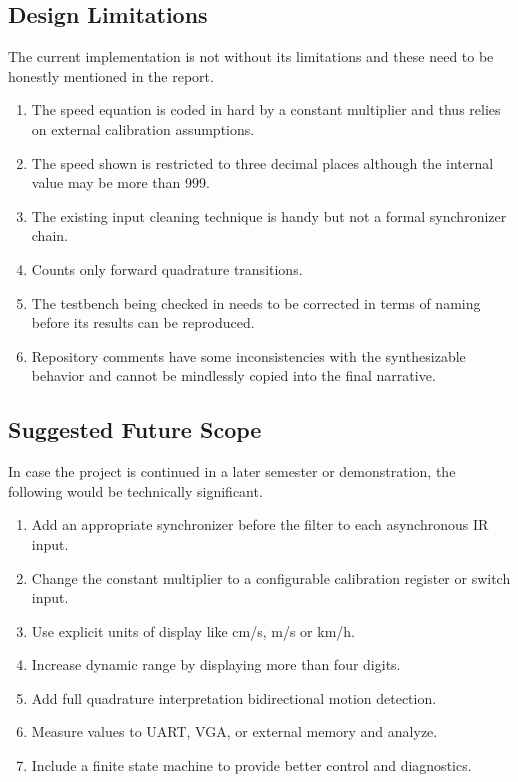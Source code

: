 \documentclass[conference,a4paper]{IEEEtran}
\begin{document}
\subsection{Design Limitations}
The current implementation is not without its limitations and these need to be honestly mentioned in the report.
\begin{enumerate}
\item The speed equation is coded in hard by a constant multiplier and thus relies on external calibration assumptions.
\item The speed shown is restricted to three decimal places although the internal value may be more than 999.
\item The existing input cleaning technique is handy but not a formal synchronizer chain.
\item Counts only forward quadrature transitions.
\item The testbench being checked in needs to be corrected in terms of naming before its results can be reproduced.
\item Repository comments have some inconsistencies with the synthesizable behavior and cannot be mindlessly copied into the final narrative.
\end{enumerate}

\subsection{Suggested Future Scope}
In case the project is continued in a later semester or demonstration, the following would be technically significant.
\begin{enumerate}
\item Add an appropriate synchronizer before the filter to each asynchronous IR input.
\item Change the constant multiplier to a configurable calibration register or switch input.
\item Use explicit units of display like cm/s, m/s or km/h.
\item Increase dynamic range by displaying more than four digits.
\item Add full quadrature interpretation bidirectional motion detection.
\item Measure values to UART, VGA, or external memory and analyze.
\item Include a finite state machine to provide better control and diagnostics.
\end{enumerate}
\end{document}

